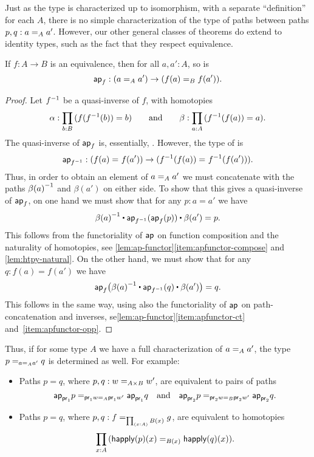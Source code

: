 Just as the type  is characterized up to isomorphism, with
a separate ``definition'' for each $A$, there is no simple
characterization of the type  of paths between
paths $p,q : \id[A]{a}{a'}$.
However, our other general classes of theorems do extend to identity types, such as the fact that they respect equivalence.

\begin{thm}\label{thm:paths-respects-equiv}
  If $f : A \to B$ is an equivalence, then for all $a,a':A$, so is
  \[\apfunc{f} : (\id[A]{a}{a'}) \to (\id[B]{f(a)}{f(a')}).\]
\end{thm}
\begin{proof}
  Let $\opp f$ be a quasi-inverse of $f$, with homotopies
  \begin{equation*}
    \alpha:\prd{b:B} (f(\opp f(b))=b)
    \qquad\text{and}\qquad
    \beta:\prd{a:A} (\opp f(f(a)) = a).
  \end{equation*}
  The quasi-inverse of $\apfunc{f}$ is, essentially, .
  However, the type of  is
  \[\apfunc{\opp f} : (\id{f(a)}{f(a')}) \to (\id{\opp f(f(a))}{\opp f(f(a'))}).\]
  Thus, in order to obtain an element of $\id[A]{a}{a'}$ we must concatenate with the paths $\opp{\beta(a)}$ and $\beta (a')$ on either side.
  To show that this gives a quasi-inverse of $\apfunc{f}$, on one hand we must show that for any $p:a=a'$ we have
  \[ \opp{\beta(a)} \ct \apfunc{\opp f}(\apfunc{f}(p)) \ct \beta(a') = p. \]
  This follows from the functoriality of $\apfunc{}$ on function composition and the naturality of homotopies, see \autoref{lem:ap-functor}\ref{item:apfunctor-compose} and \autoref{lem:htpy-natural}.
  On the other hand, we must show that for any $q:f(a)=f(a')$ we have
  \[ \apfunc{f}\big( \opp{\beta(a)} \ct \apfunc{\opp f}(q) \ct \beta(a') \big) = q. \]
  This follows in the same way, using also the functoriality of $\apfunc{}$ on path-concatenation and inverses, se\autoref{lem:ap-functor}\ref{item:apfunctor-ct} and~\ref{item:apfunctor-opp}.
\end{proof}

Thus, if for some type $A$ we have a full characterization of $\id[A]{a}{a'}$, the type $\id[{\id[A]{a}{a'}}]{p}{q}$ is determined as well.  
For example:
\begin{itemize}
\item Paths $p = q$, where $p,q : \id[A \times B]{w}{w'}$, are equivalent to pairs of paths
  \[\id[{\id[A]{\proj{1} w}{\proj{1} w'}}]{\projpath{1}{p}}{\projpath{1}{q}}
  \quad\text{and}\quad
  \id[{\id[B]{\proj{2} w}{\proj{2} w'}}]{\projpath{2}{p}}{\projpath{2}{q}}.
  \]
\item Paths $p = q$, where $p,q : \id[\prd{x:A} B(x)]{f}{g}$, are equivalent to homotopies
  \[\prd{x:A} (\id[B(x)] {\happly(p)(x)}{\happly(q)(x)}).\]
\end{itemize}

